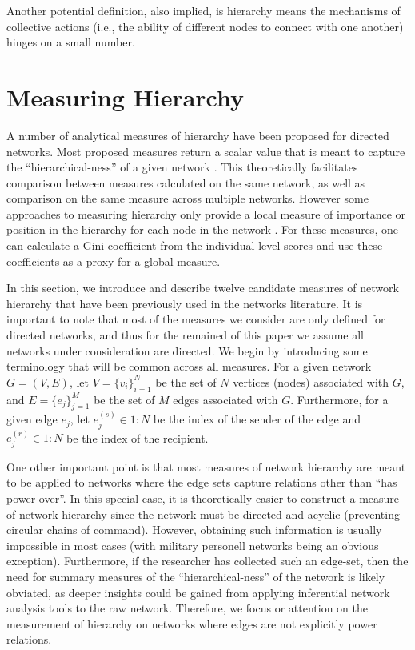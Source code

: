 \documentclass[3p,times]{elsarticle}
\begin{document}
Another potential definition, also implied, is hierarchy means the mechanisms of collective actions (i.e., the ability of different nodes to connect with one another) hinges on a small number.

\section{Measuring Hierarchy}
A number of analytical measures of hierarchy have been proposed for directed networks. Most proposed measures return a scalar value that is meant to capture the ``hierarchical-ness'' of a given network \cite{Mones2012, Shizuka2012, bonacich1972factoring, freeman1977set, Kendall1940, landau1951dominance, Suchecki2013a}. This theoretically facilitates comparison between measures calculated on the same network, as well as comparison on the same measure across multiple networks. However some approaches to measuring hierarchy only provide a local measure of importance or position in the hierarchy for each node in the network \cite{an2015multilevel}. For these measures, one can calculate a Gini coefficient \cite{yitzhaki1979relative} from the individual level scores and use these coefficients as a proxy for a global measure. 

In this section, we introduce and describe twelve candidate measures of network hierarchy that have been previously used in the networks literature. It is important to note that most of the measures we consider are only defined for directed networks, and thus for the remained of this paper we assume all networks under consideration are directed. We begin by introducing some terminology that will be common across all measures. For a given network $G=(V,E)$, let $V=\{v_i\}_{i=1}^N$ be the set of $N$ vertices (nodes) associated with $G$, and $E=\{e_j\}_{j=1}^M$ be the set of $M$ edges associated with $G$. Furthermore, for a given edge $e_j$, let $e_j^{(s)} \in 1:N$ be the index of the sender of the edge and $e_j^{(r)} \in 1:N$ be the index of the recipient. 

One other important point is that most measures of network hierarchy are meant to be applied to networks where the edge sets capture relations other than ``has power over''. In this special case, it is theoretically easier to construct a measure of network hierarchy since the network must be directed and acyclic (preventing circular chains of command). However, obtaining such information is usually impossible in most cases (with military personell networks being an obvious exception). Furthermore, if the researcher has collected such an edge-set, then the need for summary measures of the ``hierarchical-ness'' of the network is likely obviated, as deeper insights could be gained from applying inferential network analysis tools to the raw network. Therefore, we focus or attention on the measurement of hierarchy on networks where edges are not explicitly power relations.
\end{document}

